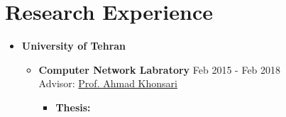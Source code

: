 \documentclass[a4paper,10pt]{article} %
\begin{document}
	\color{blue}
\section{Research Experience}
\color{Black}
\begin{itemize}
	
	\item \textbf{University of Tehran}
	\begin{itemize}
		\item
		\textbf{Computer Network Labratory}  \hfill{Feb 2015 - Feb 2018} \\{Advisor: \href{https://scholar.google.com/citations?user=Xfvk1SoAAAAJ&hl=en}{Prof. Ahmad Khonsari}}
		\begin{itemize}
			\item
			\textbf{Thesis: }{ }\\
		\end{itemize}
		
	\end{itemize}
\end{itemize}
\end{document}
